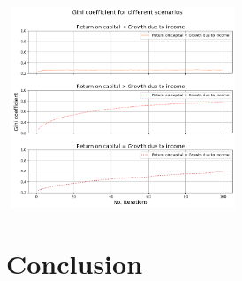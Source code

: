 \documentclass{article}
\begin{document}
\vspace{0.3cm}
\includegraphics[width=7cm,height=6cm]{ratio_comparison.png}


\section*{Conclusion}
\end{document}
